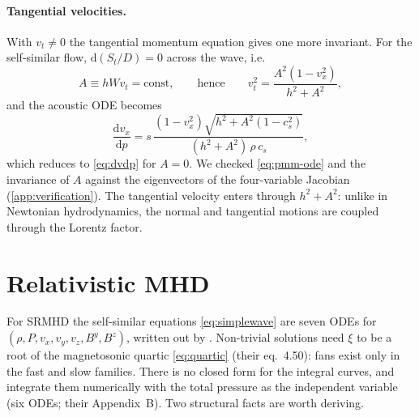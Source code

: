 \documentclass[11pt,a4paper,oneside,openany]{book}
\newcommand{\textcite}{\citet}
\newcommand{\parencite}{\citep}
\theoremstyle{definition}
\theoremstyle{plain}
\theoremstyle{remark}
\newcommand{\dd}{\mathrm{d}}
\newcommand{\Ptot}{P}
\begin{document}
\paragraph{Tangential velocities.} With $v_t\ne0$ the tangential momentum equation gives one
more invariant. For the self-similar flow, $\dd(S_t/D)=0$ across the wave, i.e.
\begin{equation}\label{eq:Ainv}
A\equiv hWv_t=\text{const},\qquad\text{hence}\qquad
v_t^2=\frac{A^2(1-v_x^2)}{h^2+A^2},
\end{equation}
and the acoustic ODE becomes \parencite{Pons2000}
\begin{equation}\label{eq:pmm-ode}
\frac{\dd v_x}{\dd p}=s\,\frac{(1-v_x^2)\sqrt{h^2+A^2(1-c_s^2)}}{(h^2+A^2)\,\rho\,c_s},
\end{equation}
which reduces to \eqref{eq:dvdp} for $A=0$. We checked \eqref{eq:pmm-ode} and the
invariance of $A$ against the eigenvectors of the four-variable Jacobian
(\cref{app:verification}). The tangential velocity enters through $h^2+A^2$: unlike in
Newtonian hydrodynamics, the normal and tangential motions are coupled through the
Lorentz factor.

\section{Relativistic MHD}\label{sec:mhd-raref}

For SRMHD the self-similar equations \eqref{eq:simplewave} are seven ODEs for
$(\rho,\Ptot,v_x,v_y,v_z,B^y,B^z)$, written out by \textcite[eqs.~4.43--4.49]{GiacomazzoRezzolla2006}.
Non-trivial solutions need $\xi$ to be a root of the magnetosonic quartic \eqref{eq:quartic}
(their eq.~4.50): fans exist only in the fast and slow families. There is no closed form
for the integral curves, and \textcite{GiacomazzoRezzolla2006} integrate them numerically
with the total pressure as the independent variable (six ODEs; their Appendix~B). Two
structural facts are worth deriving.
\end{document}
